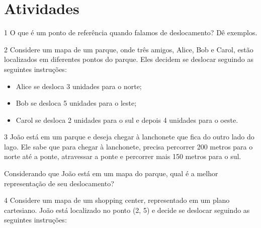 \section*{Atividades}

\num{1} O que é um ponto de referência quando falamos de deslocamento? Dê
exemplos.


\num{2} Considere um mapa de um parque, onde três amigos, Alice, Bob e Carol,
estão localizados em diferentes pontos do parque. Eles decidem se
deslocar seguindo as seguintes instruções:

\begin{itemize}
\item Alice se desloca 3 unidades para o norte; 
\item Bob se desloca 5
unidades para o leste; 
\item Carol se desloca 2 unidades para o sul e
depois 4 unidades para o oeste.
\end{itemize}


\num{3} João está em um parque e deseja chegar à lanchonete que fica do outro
lado do lago. Ele sabe que para chegar à lanchonete, precisa percorrer
200 metros para o norte até a ponte, atravessar a ponte e percorrer mais
150 metros para o sul.

Considerando que João está em um mapa do parque, qual é a melhor
representação de seu deslocamento?


\num{4} Considere um mapa de um shopping center, representado em um plano
cartesiano. João está localizado no ponto (2, 5) e decide se deslocar
seguindo as seguintes instruções:


